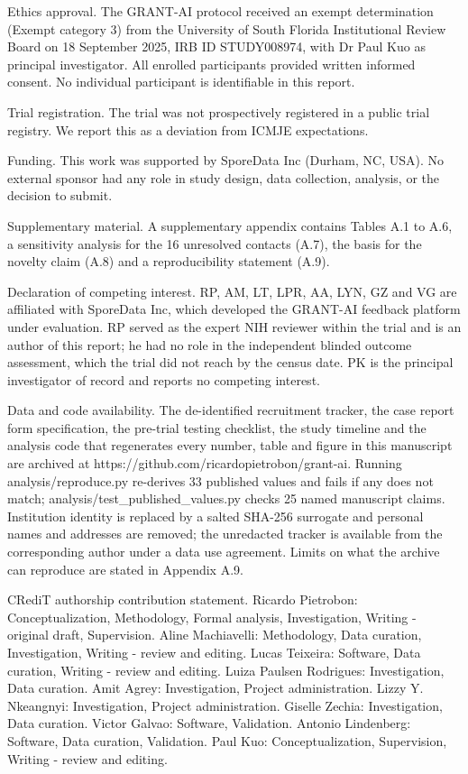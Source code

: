 \documentclass[11pt,a4paper]{article}
\begin{document}
Ethics approval. The GRANT-AI protocol received an exempt determination (Exempt category 3) from the University of South Florida Institutional Review Board on 18 September 2025, IRB ID STUDY008974, with Dr Paul Kuo as principal investigator. All enrolled participants provided written informed consent. No individual participant is identifiable in this report.

Trial registration. The trial was not prospectively registered in a public trial registry. We report this as a deviation from ICMJE expectations.

Funding. This work was supported by SporeData Inc (Durham, NC, USA). No external sponsor had any role in study design, data collection, analysis, or the decision to submit.

Supplementary material. A supplementary appendix contains Tables A.1 to A.6, a sensitivity analysis for the 16 unresolved contacts (A.7), the basis for the novelty claim (A.8) and a reproducibility statement (A.9).

Declaration of competing interest. RP, AM, LT, LPR, AA, LYN, GZ and VG are affiliated with SporeData Inc, which developed the GRANT-AI feedback platform under evaluation. RP served as the expert NIH reviewer within the trial and is an author of this report; he had no role in the independent blinded outcome assessment, which the trial did not reach by the census date. PK is the principal investigator of record and reports no competing interest.

Data and code availability. The de-identified recruitment tracker, the case report form specification, the pre-trial testing checklist, the study timeline and the analysis code that regenerates every number, table and figure in this manuscript are archived at https://github.com/ricardopietrobon/grant-ai. Running analysis/reproduce.py re-derives 33 published values and fails if any does not match; analysis/test\_published\_values.py checks 25 named manuscript claims. Institution identity is replaced by a salted SHA-256 surrogate and personal names and addresses are removed; the unredacted tracker is available from the corresponding author under a data use agreement. Limits on what the archive can reproduce are stated in Appendix A.9.

CRediT authorship contribution statement. Ricardo Pietrobon: Conceptualization, Methodology, Formal analysis, Investigation, Writing - original draft, Supervision. Aline Machiavelli: Methodology, Data curation, Investigation, Writing - review and editing. Lucas Teixeira: Software, Data curation, Writing - review and editing. Luiza Paulsen Rodrigues: Investigation, Data curation. Amit Agrey: Investigation, Project administration. Lizzy Y. Nkeangnyi: Investigation, Project administration. Giselle Zechia: Investigation, Data curation. Victor Galvao: Software, Validation. Antonio Lindenberg: Software, Data curation, Validation. Paul Kuo: Conceptualization, Supervision, Writing - review and editing.
\end{document}
